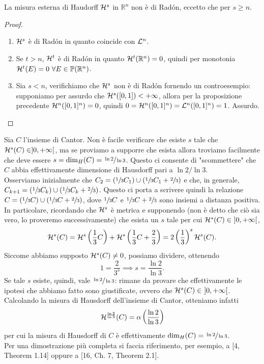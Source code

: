 \begin{corollary}[$*$]\label{cor: 1.2 Hausdorff non Radon}
  La misura esterna di Haudorff $\mathcal{H}^{s}$ in $\mathbb{R}^{n}$ non è di Radón, eccetto che per $s \geq n$.
\end{corollary}
\begin{proof}~
  \begin{enumerate}[label=$(\roman*)$]
    \item $\mathcal{H}^s$ è di Radón in quanto coincide con $\mathcal{L}^n$.
    \item Se $t>n$, $\mathcal{H}^t$ è di Radón in quanto $\mathcal{H}^t(\mathbb{R}^n)=0$, quindi per monotonia $\mathcal{H}^t(E)=0\ \forall E\in \mathbb{P}(\mathbb{R}^n)$.
    \item Sia $s<n$, verifichiamo che $\mathcal{H}^s$ non è di Radón fornendo un controesempio: supponiamo per assurdo che $\mathcal{H}^s([0,1])<+\infty$, allora per la proposizione precedente $\mathcal{H}^n([0,1]^n)=0$, quindi $0=\mathcal{H}^n([0,1]^n)=\mathcal{L}^n([0,1]^n)=1$. Assurdo.\qedhere
  \end{enumerate}
\end{proof}

\begin{example}Sia $C$ l'insieme di Cantor. Non è facile verificare che esiste $s$ tale che $\mathcal{H}^{s}(C) \in]0,+\infty[$, ma se proviamo a supporre che esista allora troviamo facilmente che deve essere $s=\operatorname{dim}_{H}(C)=\sfrac{\ln 2}{\ln 3}$. Questo ci consente di "scommettere" che $C$ abbia effettivamente dimensione di Hausdorff pari a $\ln 2 / \ln 3$.\\
Osserviamo inizialmente che $C_2 = (\sfrac{1}{3}C_1)\cup (\sfrac{1}{3}C_1+\sfrac{2}{3})$ e che, in generale, $C_{k+1} = (\sfrac{1}{3}C_k)\cup (\sfrac{1}{3}C_k+\sfrac{2}{3})$. Questo ci porta a scrivere quindi la relazione $C = (\sfrac{1}{3}C)\cup (\sfrac{1}{3}C+\sfrac{2}{3})$, dove $\sfrac{1}{3}C$ e $\sfrac{1}{3}C+\sfrac{2}{3}$ sono insiemi a distanza positiva. In particolare, ricordando che $\mathcal{H}^s$ è metrica e supponendo (non è detto che ciò sia vero, lo proveremo successivamente) che esista un $s$ tale per cui $\mc H^s(C)\in\ ]0,+\infty[$,
\[\mathcal{H}^s(C) = \mathcal{H}^s\left(\frac{1}{3}C\right)+\mathcal{H}^s\left(\frac{1}{3}C+\frac{2}{3}\right) = 2 \left(\frac{1}{3}\right)^s \mathcal{H}^s(C).\]
Siccome abbiamo supposto $\mathcal{H}^s(C)\neq 0$, possiamo dividere, ottenendo 
\[1 = \frac{2}{3^s} \implies s = \frac{\ln 2}{\ln 3}.\]
Se tale $s$ esiste, quindi, vale $\sfrac{\ln 2}{\ln 3}$: rimane da provare che effettivamente le ipotesi che abbiamo fatto sono giustificate, ovvero che $\mc H^s(C) \in\ ]0,+\infty[$. Calcolando la misura di Hausdorff dell'insieme di Cantor, otteniamo infatti 
\[\mathcal{H}^{\frac{\ln 2}{\ln 3}} (C) = \alpha\left(\frac{\ln 2}{\ln 3}\right)\]
per cui la misura di Hausdorff di $C$ è effettivamente $\operatorname{dim}_{H}(C)=\sfrac{\ln 2}{\ln 3}$.\\
Per una dimostrazione più completa si faccia riferimento, per esempio, a [4, Theorem 1.14] oppure a [16, Ch. 7, Theorem 2.1].
\end{example}

